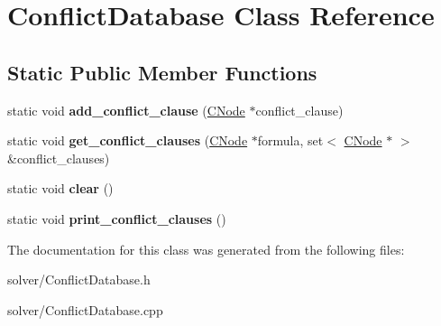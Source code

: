 \hypertarget{classConflictDatabase}{\section{\-Conflict\-Database \-Class \-Reference}
\label{classConflictDatabase}
}
\subsection*{\-Static \-Public \-Member \-Functions}
\begin{DoxyCompactItemize}
\item 
\hypertarget{classConflictDatabase_a326f5ce6a76e4e59407fe2226eadf0f4}{static void {\bfseries add\-\_\-conflict\-\_\-clause} (\hyperlink{classCNode}{\-C\-Node} $\ast$conflict\-\_\-clause)}\label{classConflictDatabase_a326f5ce6a76e4e59407fe2226eadf0f4}

\item 
\hypertarget{classConflictDatabase_acc5dd4bfec3a773ad8beb78b50d9a1d9}{static void {\bfseries get\-\_\-conflict\-\_\-clauses} (\hyperlink{classCNode}{\-C\-Node} $\ast$formula, set$<$ \hyperlink{classCNode}{\-C\-Node} $\ast$ $>$ \&conflict\-\_\-clauses)}\label{classConflictDatabase_acc5dd4bfec3a773ad8beb78b50d9a1d9}

\item 
\hypertarget{classConflictDatabase_a50c202ad3a9d21cbc777a4a1280e8f07}{static void {\bfseries clear} ()}\label{classConflictDatabase_a50c202ad3a9d21cbc777a4a1280e8f07}

\item 
\hypertarget{classConflictDatabase_a3051b79035042718fd84920dbdb8aca6}{static void {\bfseries print\-\_\-conflict\-\_\-clauses} ()}\label{classConflictDatabase_a3051b79035042718fd84920dbdb8aca6}

\end{DoxyCompactItemize}


\-The documentation for this class was generated from the following files\-:\begin{DoxyCompactItemize}
\item 
solver/\-Conflict\-Database.\-h\item 
solver/\-Conflict\-Database.\-cpp\end{DoxyCompactItemize}

